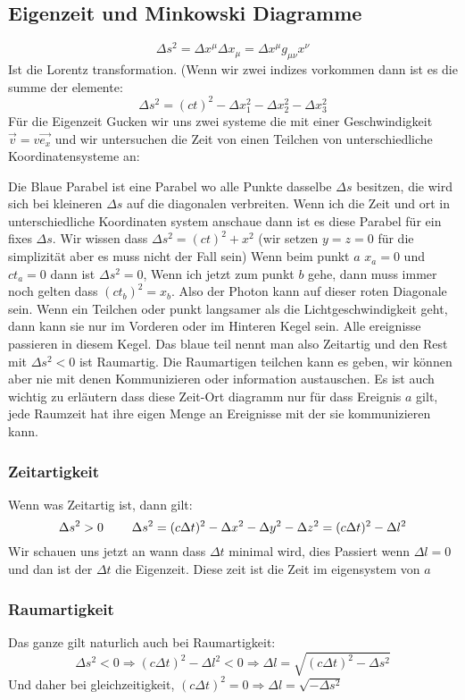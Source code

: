\documentclass{article}
\newcommand{\mspc}{\hspace{0.4cm}}
\begin{document}
\subsection*{Eigenzeit und Minkowski Diagramme}
\[\Delta s^2=\Delta x^\mu\Delta x_\mu=\Delta x^\mu g_{\mu\nu}x^\nu\]
Ist die Lorentz transformation. (Wenn wir zwei indizes vorkommen dann ist es die summe der elemente:\[\Delta s^2= (ct)^2-\Delta x_1^2-\Delta x_2^2-\Delta x_3^2\]
Für die Eigenzeit Gucken wir uns zwei systeme die mit einer Geschwindigkeit $\vec{v}=v\vec{e_x}$ und wir untersuchen die Zeit von einen Teilchen von unterschiedliche Koordinatensysteme an:
\begin{center}\end{center}
Die Blaue Parabel ist eine Parabel wo alle Punkte dasselbe $\Delta s$ besitzen, die wird sich bei kleineren $\Delta s$ auf die diagonalen verbreiten. Wenn ich die Zeit und ort in unterschiedliche Koordinaten system anschaue dann ist es diese Parabel für ein fixes $\Delta s$.
Wir wissen dass $\Delta s^2=(ct)^2+x^2$ (wir setzen $y=z=0$ für die simplizität aber es muss nicht der Fall sein) Wenn beim punkt $a$ $x_a=0$ und $ct_a=0$ dann ist $\Delta s^2=0$,
Wenn ich jetzt zum punkt $b$ gehe, dann muss immer noch gelten dass $(ct_b)^2=x_b$. Also der Photon kann auf dieser roten Diagonale sein. Wenn ein Teilchen oder punkt langsamer als die
Lichtgeschwindigkeit geht, dann kann sie nur im Vorderen oder im Hinteren Kegel sein. Alle ereignisse passieren in diesem Kegel. Das blaue teil nennt man also Zeitartig und den Rest mit $\Delta s^2<0$ ist Raumartig. Die Raumartigen teilchen kann es geben, wir können aber nie mit denen Kommunizieren oder information austauschen.
Es ist auch wichtig zu erläutern dass diese Zeit-Ort diagramm nur für dass Ereignis $a$ gilt, jede Raumzeit hat ihre eigen Menge an Ereignisse mit der sie kommunizieren kann.
\subsubsection*{Zeitartigkeit} Wenn was Zeitartig ist, dann gilt:\[\Delta s^2 > 0\mspc\mspc\Delta s^2=(c\Delta t)^2-\Delta x^2-\Delta y^2-\Delta z^2=(c\Delta t)^2-\Delta l^2\]
Wir schauen uns jetzt an wann dass $\Delta t$ minimal wird, dies Passiert wenn $\Delta l=0$ und dan ist der $\Delta t$ die Eigenzeit. Diese zeit ist die Zeit im eigensystem von $a$
\subsubsection*{Raumartigkeit}Das ganze gilt naturlich auch bei Raumartigkeit:
\[\Delta s^2<0\Rightarrow (c\Delta t)^2-\Delta l^2<0\Rightarrow\Delta l=\sqrt{(c\Delta t)^2-\Delta s^2}\]Und daher bei gleichzeitigkeit, $(c\Delta t)^2=0\Rightarrow \Delta l=\sqrt{-\Delta s^2}$
\end{document}
